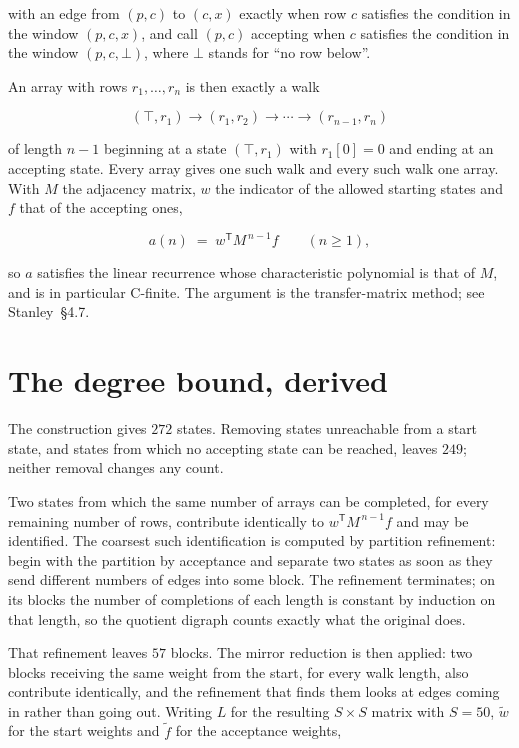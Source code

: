 \documentclass[11pt]{article}
\theoremstyle{definition}
\begin{document}
with an edge from $(p,c)$ to $(c,x)$ exactly when row $c$ satisfies the condition in the window $(p,c,x)$, and call $(p,c)$ accepting when $c$ satisfies the condition in the window $(p,c,\bot)$, where $\bot$ stands for ``no row below''.

An array with rows $r_1,\dots,r_n$ is then exactly a walk

\[(\top,r_1) \to (r_1,r_2) \to \cdots \to (r_{n-1},r_n)\]

of length $n-1$ beginning at a state $(\top,r_1)$ with $r_1[0]=0$ and ending at an accepting state. Every array gives one such walk and every such walk one array. With $M$ the adjacency matrix, $w$ the indicator of the allowed starting states and $f$ that of the accepting ones,

\[a(n) \;=\; w^{\mathsf T} M^{\,n-1} f \qquad (n \ge 1),\]

so $a$ satisfies the linear recurrence whose characteristic polynomial is that of $M$, and is in particular C-finite. The argument is the transfer-matrix method; see Stanley~\S4.7.

\section{The degree bound, derived}

The construction gives $272$ states. Removing states unreachable from a start state, and states from which no accepting state can be reached, leaves $249$; neither removal changes any count.

Two states from which the same number of arrays can be completed, for every remaining number of rows, contribute identically to $w^{\mathsf T}M^{\,n-1}f$ and may be identified. The coarsest such identification is computed by partition refinement: begin with the partition by acceptance and separate two states as soon as they send different numbers of edges into some block. The refinement terminates; on its blocks the number of completions of each length is constant by induction on that length, so the quotient digraph counts exactly what the original does.

That refinement leaves $57$ blocks. The mirror reduction is then applied: two blocks receiving the same weight from the start, for every walk length, also contribute identically, and the refinement that finds them looks at edges coming in rather than going out. Writing $L$ for the resulting $S \times S$ matrix with $S = 50$, $\tilde w$ for the start weights and $\tilde f$ for the acceptance weights,
\end{document}

